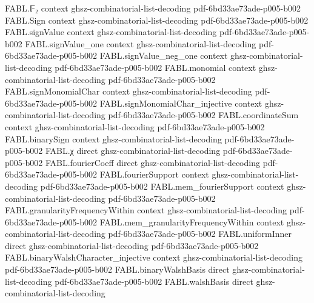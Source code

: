 \begin{theorem}
\label{FABL.vector_fourier_expansion}
\leanok
{}
\proofstep
  {FABL.𝔽₂}
  {context}
  {ghsz-combinatorial-list-decoding}
  {pdf-6bd33ae73ade-p005-b002}
\proofstep
  {FABL.Sign}
  {context}
  {ghsz-combinatorial-list-decoding}
  {pdf-6bd33ae73ade-p005-b002}
\proofstep
  {FABL.signValue}
  {context}
  {ghsz-combinatorial-list-decoding}
  {pdf-6bd33ae73ade-p005-b002}
\proofstep
  {FABL.signValue_one}
  {context}
  {ghsz-combinatorial-list-decoding}
  {pdf-6bd33ae73ade-p005-b002}
\proofstep
  {FABL.signValue_neg_one}
  {context}
  {ghsz-combinatorial-list-decoding}
  {pdf-6bd33ae73ade-p005-b002}
\proofstep
  {FABL.monomial}
  {context}
  {ghsz-combinatorial-list-decoding}
  {pdf-6bd33ae73ade-p005-b002}
\proofstep
  {FABL.signMonomialChar}
  {context}
  {ghsz-combinatorial-list-decoding}
  {pdf-6bd33ae73ade-p005-b002}
\proofstep
  {FABL.signMonomialChar_injective}
  {context}
  {ghsz-combinatorial-list-decoding}
  {pdf-6bd33ae73ade-p005-b002}
\proofstep
  {FABL.coordinateSum}
  {context}
  {ghsz-combinatorial-list-decoding}
  {pdf-6bd33ae73ade-p005-b002}
\proofstep
  {FABL.binarySign}
  {context}
  {ghsz-combinatorial-list-decoding}
  {pdf-6bd33ae73ade-p005-b002}
\proofstep
  {FABL.χ}
  {direct}
  {ghsz-combinatorial-list-decoding}
  {pdf-6bd33ae73ade-p005-b002}
\proofstep
  {FABL.fourierCoeff}
  {direct}
  {ghsz-combinatorial-list-decoding}
  {pdf-6bd33ae73ade-p005-b002}
\proofstep
  {FABL.fourierSupport}
  {context}
  {ghsz-combinatorial-list-decoding}
  {pdf-6bd33ae73ade-p005-b002}
\proofstep
  {FABL.mem_fourierSupport}
  {context}
  {ghsz-combinatorial-list-decoding}
  {pdf-6bd33ae73ade-p005-b002}
\proofstep
  {FABL.granularityFrequencyWithin}
  {context}
  {ghsz-combinatorial-list-decoding}
  {pdf-6bd33ae73ade-p005-b002}
\proofstep
  {FABL.mem_granularityFrequencyWithin}
  {context}
  {ghsz-combinatorial-list-decoding}
  {pdf-6bd33ae73ade-p005-b002}
\proofstep
  {FABL.uniformInner}
  {direct}
  {ghsz-combinatorial-list-decoding}
  {pdf-6bd33ae73ade-p005-b002}
\proofstep
  {FABL.binaryWalshCharacter_injective}
  {context}
  {ghsz-combinatorial-list-decoding}
  {pdf-6bd33ae73ade-p005-b002}
\proofstep
  {FABL.binaryWalshBasis}
  {direct}
  {ghsz-combinatorial-list-decoding}
  {pdf-6bd33ae73ade-p005-b002}
\proofstep
  {FABL.walshBasis}
  {direct}
  {ghsz-combinatorial-list-decoding}

\end{theorem}
